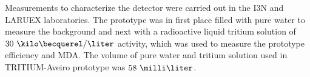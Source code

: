 Measurements to characterize the detector were carried out in the I3N and LARUEX laboratories. The prototype was in first place filled with pure water to measure the background and next with a radioactive liquid tritium solution of $30~\kilo\becquerel/\liter$ activity, which was used to measure the prototype efficiency and MDA. The volume of pure water and tritium solution used in TRITIUM-Aveiro prototype was $58~\milli\liter$. 






